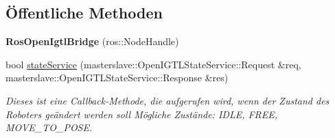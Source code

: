 \subsection*{Öffentliche Methoden}
\begin{DoxyCompactItemize}
\item 
\hypertarget{classRosOpenIgtlBridge_a46b348ca4dee935c87eea78653046cc0}{{\bfseries Ros\-Open\-Igtl\-Bridge} (ros\-::\-Node\-Handle)}\label{classRosOpenIgtlBridge_a46b348ca4dee935c87eea78653046cc0}

\item 
bool \hyperlink{classRosOpenIgtlBridge_ac8d2f37fe82fb7d0496d937920f48db6}{state\-Service} (masterslave\-::\-Open\-I\-G\-T\-L\-State\-Service\-::\-Request \&req, masterslave\-::\-Open\-I\-G\-T\-L\-State\-Service\-::\-Response \&res)
\begin{DoxyCompactList}\small\item\em Dieses ist eine Callback-\/\-Methode, die aufgerufen wird, wenn der Zustand des Roboters geändert werden soll Mögliche Zustände\-: I\-D\-L\-E, F\-R\-E\-E, M\-O\-V\-E\-\_\-\-T\-O\-\_\-\-P\-O\-S\-E. \end{DoxyCompactList}\end{DoxyCompactItemize}
